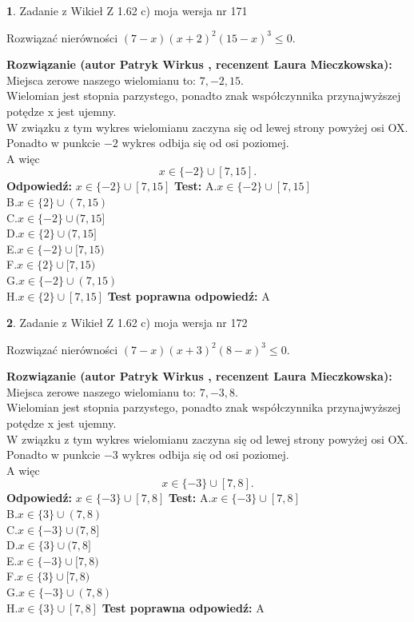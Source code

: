 \documentclass[12pt, a4paper]{article}
\theoremstyle{definition} %
\newtheorem{zad}{}
\newcommand{\zadStart}[1]{\begin{zad}#1\newline}
\newcommand{\zadStop}{\end{zad}}
\newcommand{\rozwStart}[2]{\noindent \textbf{Rozwiązanie (autor #1 , recenzent #2): }\newline}
\newcommand{\rozwStop}{\newline}
\newcommand{\odpStart}{\noindent \textbf{Odpowiedź:}\newline}
\newcommand{\odpStop}{\newline}
\newcommand{\testStart}{\noindent \textbf{Test:}\newline}
\newcommand{\testStop}{\newline}
\newcommand{\kluczStart}{\noindent \textbf{Test poprawna odpowiedź:}\newline}
\newcommand{\kluczStop}{\newline}
\begin{document}
\zadStart{Zadanie z Wikieł Z 1.62 c) moja wersja nr 171}

Rozwiązać nierówności $(7-x)(x+2)^{2}(15-x)^{3}\le0$.
\zadStop
\rozwStart{Patryk Wirkus}{Laura Mieczkowska}
Miejsca zerowe naszego wielomianu to: $7, -2, 15$.\\
Wielomian jest stopnia parzystego, ponadto znak współczynnika przy\linebreak najwyższej potędze x jest ujemny.\\ W związku z tym wykres wielomianu zaczyna się od lewej strony powyżej osi OX.\\
Ponadto w punkcie $-2$ wykres odbija się od osi poziomej.\\
A więc $$x \in \{-2\} \cup [7,15].$$
\rozwStop
\odpStart
$x \in \{-2\} \cup [7,15]$
\odpStop
\testStart
A.$x \in \{-2\} \cup [7,15]$\\
B.$x \in \{2\} \cup (7,15)$\\
C.$x \in \{-2\} \cup (7,15]$\\
D.$x \in \{2\} \cup (7,15]$\\
E.$x \in \{-2\} \cup [7,15)$\\
F.$x \in \{2\} \cup [7,15)$\\
G.$x \in \{-2\} \cup (7,15)$\\
H.$x \in \{2\} \cup [7,15]$
\testStop
\kluczStart
A
\kluczStop



\zadStart{Zadanie z Wikieł Z 1.62 c) moja wersja nr 172}

Rozwiązać nierówności $(7-x)(x+3)^{2}(8-x)^{3}\le0$.
\zadStop
\rozwStart{Patryk Wirkus}{Laura Mieczkowska}
Miejsca zerowe naszego wielomianu to: $7, -3, 8$.\\
Wielomian jest stopnia parzystego, ponadto znak współczynnika przy\linebreak najwyższej potędze x jest ujemny.\\ W związku z tym wykres wielomianu zaczyna się od lewej strony powyżej osi OX.\\
Ponadto w punkcie $-3$ wykres odbija się od osi poziomej.\\
A więc $$x \in \{-3\} \cup [7,8].$$
\rozwStop
\odpStart
$x \in \{-3\} \cup [7,8]$
\odpStop
\testStart
A.$x \in \{-3\} \cup [7,8]$\\
B.$x \in \{3\} \cup (7,8)$\\
C.$x \in \{-3\} \cup (7,8]$\\
D.$x \in \{3\} \cup (7,8]$\\
E.$x \in \{-3\} \cup [7,8)$\\
F.$x \in \{3\} \cup [7,8)$\\
G.$x \in \{-3\} \cup (7,8)$\\
H.$x \in \{3\} \cup [7,8]$
\testStop
\kluczStart
A
\kluczStop
\end{document}

